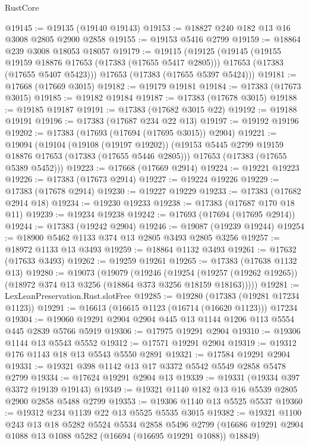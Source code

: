 \begin{lexlean}{RustCore}
\begin{coremodule}
@19145 := @19135 (@19140 @19143)
@19153 := @18827 @240 @182 @13 @16 @3008 @2805 @2900 @2858
@19155 := @19153 @5416 @2799
@19159 := @18864 @239 @3008 @18053 @18057
@19179 := @19115
    (@19125
      (@19145
        (@19155 @19159 @18876 @17653 (@17383 (@17655 @5417 @2805)))
        @17653
        (@17383 (@17655 @5407 @5423)))
      @17653
      (@17383 (@17655 @5397 @5424)))
@19181 := @17668 (@17669 @3015)
@19182 := @19179 @19181
@19184 := @17383 (@17673 @3015)
@19185 := @19182 @19184
@19187 := @17383 (@17678 @3015)
@19188 := @19185 @19187
@19191 := @17383 (@17682 @3015 @22)
@19192 := @19188 @19191
@19196 := @17383 (@17687 @234 @22 @13)
@19197 := @19192 @19196
@19202 := @17383 (@17693 (@17694 (@17695 @3015)) @2904)
@19221 := @19094
    (@19104
      (@19108 (@19197 @19202))
      (@19153 @5445 @2799 @19159 @18876 @17653 (@17383 (@17655 @5446 @2805)))
      @17653
      (@17383 (@17655 @5389 @5452)))
@19223 := @17668 (@17669 @2914)
@19224 := @19221 @19223
@19226 := @17383 (@17673 @2914)
@19227 := @19224 @19226
@19229 := @17383 (@17678 @2914)
@19230 := @19227 @19229
@19233 := @17383 (@17682 @2914 @18)
@19234 := @19230 @19233
@19238 := @17383 (@17687 @170 @18 @11)
@19239 := @19234 @19238
@19242 := @17693 (@17694 (@17695 @2914))
@19244 := @17383 (@19242 @2904)
@19246 := @19087 (@19239 @19244)
@19254 := @18900 @5462 @1133 @374 @13 @2805 @3493 @2805 @3256
@19257 := @18972 @1133 @13 @3493
@19259 := @18864 @1132 @3493
@19261 := @17632 (@17633 @3493)
@19262 := @19259 @19261
@19265 := @17383 (@17638 @1132 @13)
@19280 := @19073
    (@19079
      (@19246
        (@19254
          (@19257 (@19262 @19265))
          (@18972 @374 @13 @3256 (@18864 @373 @3256 @18159 @18163)))))
@19281 := LexLeanPreservation.Rust.slotFree
@19285 := @19280 (@17383 (@19281 @17234 @1123))
@19291 := @16613 (@16615 @1123 (@16714 (@16620 @1123))) @17234
@19304 := @19060 @19291 @2904 @2904 @445 @13 @1144 @1206 @113 @5554 @445 @2839 @5766 @5919
@19306 := @17975 @19291 @2904
@19310 := @19306 @1144 @13 @5543 @5552
@19312 := @17571 @19291 @2904
@19319 := @19312 @176 @1143 @18 @13 @5543 @5550 @2891
@19321 := @17584 @19291 @2904
@19331 := @19321 @398 @1142 @13 @17 @3372 @5542 @5549 @2858 @5478 @2799
@19334 := @17624 @19291 @2904 @13
@19339 := @19331 (@19334 @397 @3372 @19139 @19143)
@19349 := @19321 @1140 @182 @13 @16 @5539 @2805 @2900 @2858 @5488 @2799
@19353 := @19306 @1140 @13 @5525 @5537
@19360 := @19312 @234 @1139 @22 @13 @5525 @5535 @3015
@19382 := @19321
    @1100
    @243
    @13
    @18
    @5282
    @5524
    @5534
    @2858
    @5496
    @2799
    (@16686 @19291 @2904 @1088 @13 @1088 @5282 (@16694 (@16695 @19291 @1088)) @18849)

\end{coremodule}
\end{lexlean}
